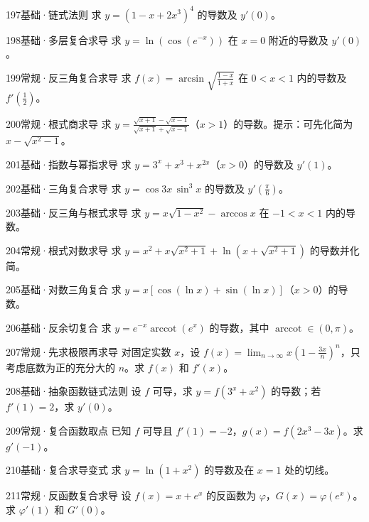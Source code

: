 \begin{exercise}{197}{基础·链式法则}
求 $y=(1-x+2x^3)^4$ 的导数及 $y'(0)$。
\end{exercise}
\begin{exercise}{198}{基础·多层复合求导}
求 $y=\ln(\cos(e^{-x}))$ 在 $x=0$ 附近的导数及 $y'(0)$。
\end{exercise}
\begin{exercise}{199}{常规·反三角复合求导}
求 $f(x)=\arcsin\sqrt{\frac{1-x}{1+x}}$ 在 $0<x<1$ 内的导数及 $f'(\frac{1}{2})$。
\end{exercise}
\begin{exercise}{200}{常规·根式商求导}
求 $y=\frac{\sqrt{x+1}-\sqrt{x-1}}{\sqrt{x+1}+\sqrt{x-1}}$（$x>1$）的导数。提示：可先化简为 $x-\sqrt{x^2-1}$。
\end{exercise}
\begin{exercise}{201}{基础·指数与幂指求导}
求 $y=3^x+x^3+x^{2x}$（$x>0$）的导数及 $y'(1)$。
\end{exercise}
\begin{exercise}{202}{基础·三角复合求导}
求 $y=\cos3x\,\sin^3x$ 的导数及 $y'(\frac{\pi}{6})$。
\end{exercise}
\begin{exercise}{203}{基础·反三角与根式求导}
求 $y=x\sqrt{1-x^2}-\arccos x$ 在 $-1<x<1$ 内的导数。
\end{exercise}
\begin{exercise}{204}{常规·根式对数求导}
求 $y=x^2+x\sqrt{x^2+1}+\ln(x+\sqrt{x^2+1})$ 的导数并化简。
\end{exercise}
\begin{exercise}{205}{基础·对数三角复合}
求 $y=x[\cos(\ln x)+\sin(\ln x)]$（$x>0$）的导数。
\end{exercise}
\begin{exercise}{206}{基础·反余切复合}
求 $y=e^{-x}\operatorname{arccot}(e^x)$ 的导数，其中 $\operatorname{arccot}\in(0,\pi)$。
\end{exercise}
\begin{exercise}{207}{常规·先求极限再求导}
对固定实数 $x$，设 $f(x)=\lim_{n\to\infty}x(1-\frac{3x}{n})^n$，只考虑底数为正的充分大的 $n$。求 $f(x)$ 和 $f'(x)$。
\end{exercise}
\begin{exercise}{208}{基础·抽象函数链式法则}
设 $f$ 可导，求 $y=f(3^x+x^2)$ 的导数；若 $f'(1)=2$，求 $y'(0)$。
\end{exercise}
\begin{exercise}{209}{常规·复合函数取点}
已知 $f$ 可导且 $f'(1)=-2$，$g(x)=f(2x^3-3x)$。求 $g'(-1)$。
\end{exercise}
\begin{exercise}{210}{基础·复合求导变式}
求 $y=\ln(1+x^2)$ 的导数及在 $x=1$ 处的切线。
\end{exercise}
\begin{exercise}{211}{常规·反函数复合求导}
设 $f(x)=x+e^x$ 的反函数为 $\varphi$，$G(x)=\varphi(e^x)$。求 $\varphi'(1)$ 和 $G'(0)$。
\end{exercise}
